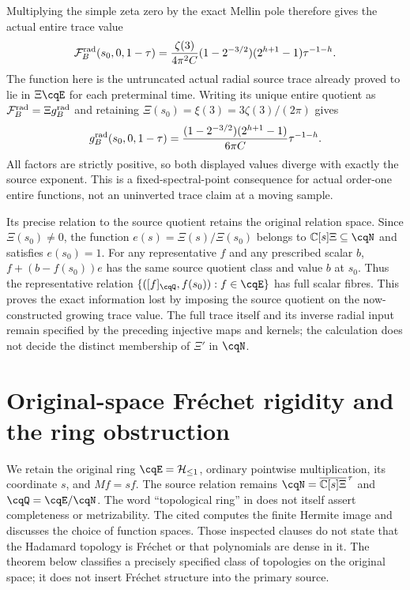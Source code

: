 Multiplying the simple zeta zero by the exact Mellin pole
therefore gives the actual entire trace value
\begin{equation}
 \mathcal F_B^{\rm rad}(s_0,0,1-\tau)
 =\frac{\zeta(3)}{4\pi^2C}
       (1-2^{-3/2})(2^{h+1}-1)\tau^{-1-h}.
 \label{eq:cq-actual-entire-trace-fixed-value}
\end{equation}
The function here is the untruncated actual radial source trace
already proved to lie in $\Xi\cqE$ for each preterminal time.
Writing its unique entire quotient as
$\mathcal F_B^{\rm rad}=\Xi g_B^{\rm rad}$ and retaining
$\Xi(s_0)=\xi(3)=3\zeta(3)/(2\pi)$ gives
\begin{equation}
 g_B^{\rm rad}(s_0,0,1-\tau)
 =\frac{(1-2^{-3/2})(2^{h+1}-1)}{6\pi C}\tau^{-1-h}.
 \label{eq:cq-actual-entire-quotient-fixed-value}
\end{equation}
All factors are strictly positive, so both displayed values
diverge with exactly the source exponent. This is a
fixed-spectral-point consequence for actual order-one entire
functions, not an uninverted trace claim at a moving sample.

Its precise relation to the source quotient retains the original
relation space. Since $\Xi(s_0)\ne0$, the function
$e(s)=\Xi(s)/\Xi(s_0)$ belongs to
$\mathbb C[s]\Xi\subseteq\cqN$ and satisfies $e(s_0)=1$.
For any representative $f$ and any prescribed scalar $b$,
$f+(b-f(s_0))e$ has the same source quotient class and
value $b$ at $s_0$. Thus the representative relation
$\{([f]_{\cqQ},f(s_0)):f\in\cqE\}$ has full scalar fibres.
This proves the exact information lost by imposing the source
quotient on the now-constructed growing trace value.
The full trace itself and its inverse radial input remain
specified by the preceding injective maps and kernels;
the calculation does not decide the distinct membership of
$\Xi'$ in $\cqN$.

\section{Original-space Fr\'echet rigidity and the ring obstruction}
\label{sec:cq-original-ring-rigidity}

We retain the original ring $\cqE=\mathcal H_{\leq1}$, ordinary
pointwise multiplication, its coordinate $s$, and
$Mf=sf$. The source relation remains
$\cqN=\overline{\mathbb C[s]\Xi}^{\,\tau}$ and
$\cqQ=\cqE/\cqN$.
The word ``topological ring'' in
\cite[\S3.6, p.19, typeset line 552 and Proposition~3.6]{cqCCM}
does not itself assert completeness or metrizability.
The cited \cite[Proposition~2.24 and the following discussion,
pp.379--381]{cqCM} computes the finite Hermite image and discusses
the choice of function spaces. Those inspected clauses do not
state that the Hadamard topology is Fr\'echet or that polynomials
are dense in it. The theorem below classifies a precisely specified
class of topologies on the original space; it does not insert
Fr\'echet structure into the primary source.

